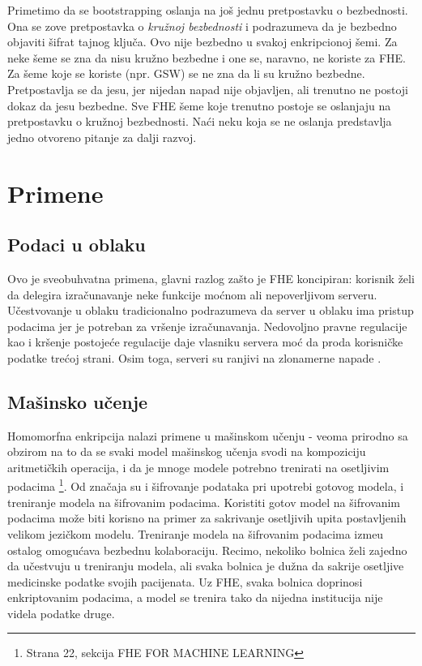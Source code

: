 Primetimo da se bootstrapping oslanja na jo\v s jednu pretpostavku o bezbednosti. Ona se zove pretpostavka o \textit{kru\v znoj bezbednosti} i podrazumeva da je bezbedno objaviti \v sifrat tajnog klju\v ca. Ovo nije bezbedno u svakoj enkripcionoj \v semi. 
Za neke \v seme se zna da nisu kru\v zno bezbedne i one se, naravno, ne koriste za FHE. Za \v seme koje se koriste (npr. GSW) se ne zna da li su kru\v zno bezbedne. Pretpostavlja se da jesu, jer nijedan napad nije objavljen, ali trenutno ne postoji dokaz da jesu bezbedne.
Sve FHE \v seme koje trenutno postoje se oslanjaju na pretpostavku o kru\v znoj bezbednosti. Na\' ci neku koja se ne oslanja predstavlja jedno otvoreno pitanje za dalji razvoj.


\section{Primene}

\subsection{Podaci u oblaku}

Ovo je sveobuhvatna primena, glavni razlog za\v sto je FHE koncipiran: korisnik \v zeli da delegira izra\v cunavanje neke funkcije mo\' cnom ali nepoverljivom serveru.
U\v cestvovanje u oblaku tradicionalno podrazumeva da server u oblaku ima pristup podacima jer je potreban za vr\v senje izra\v cunavanja.
Nedovoljno pravne regulacije kao i kr\v senje postoje\' ce regulacije daje vlasniku servera mo\' c da proda korisni\v cke podatke tre\' coj strani. Osim toga, serveri su ranjivi na zlonamerne napade \cite{ieee2026homomorphicusecases}.

\subsection{Ma\v sinsko u\v cenje}

Homomorfna enkripcija nalazi primene u ma\v sinskom u\v cenju - veoma prirodno sa obzirom na to da se svaki model ma\v sinskog u\v cenja svodi na kompoziciju aritmeti\v ckih operacija, i da je mnoge modele potrebno trenirati na osetljivim podacima \cite{marcolla2022survey} \footnote{Strana 22, sekcija FHE FOR MACHINE LEARNING}.
Od zna\v caja su i \v sifrovanje podataka pri upotrebi gotovog modela, i treniranje modela na \v sifrovanim podacima. Koristiti gotov model na \v sifrovanim podacima mo\v ze biti korisno na primer za sakrivanje osetljivih upita postavljenih velikom jezi\v ckom modelu. Treniranje modela na \v sifrovanim podacima izme\dj u ostalog omogu\' cava bezbednu kolaboraciju. Recimo, nekoliko bolnica \v zeli zajedno da u\v cestvuju u treniranju modela, ali svaka bolnica je du\v zna da sakrije osetljive medicinske podatke svojih pacijenata. Uz FHE, svaka bolnica doprinosi enkriptovanim podacima, a model se trenira tako da nijedna institucija nije videla podatke druge.

